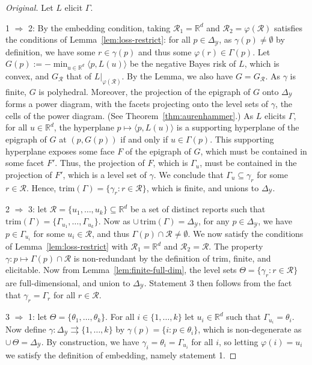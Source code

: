 \documentclass[12pt]{article}
\newcommand{\reals}{\mathbb{R}}
\newcommand{\simplex}{\Delta_\Y}
\newcommand{\R}{\mathcal{R}}
\newcommand{\Y}{\mathcal{Y}}
\newcommand{\inprod}[2]{\langle #1, #2 \rangle}%
\newcommand{\toto}{\rightrightarrows}
\newcommand{\trim}{\mathrm{trim}}
\begin{document}
\begin{proof}[Original]
	Let $L$ elicit $\Gamma$.
	
	1 $\Rightarrow$ 2:
	By the embedding condition, taking $\R_1 = \reals^d$ and $\R_2 = \varphi(\R)$ satisfies the conditions of Lemma~\ref{lem:loss-restrict}: for all $p\in\simplex$, as $\gamma(p) \neq \emptyset$ by definition, we have some $r\in\gamma(p)$ and thus some $\varphi(r) \in \Gamma(p)$.
	Let $G(p) := -\min_{u\in\reals^d} \inprod{p}{L(u)}$ be the negative Bayes risk of $L$, which is convex, and $G_{\R}$ that of $L|_{\varphi(\R)}$.
	By the Lemma, we also have $G = G_\R$.
	As $\gamma$ is finite, $G$ is polyhedral.
	Moreover, the projection of the epigraph of $G$ onto $\simplex$ forms a power diagram, with the facets projecting onto the level sets of $\gamma$, the cells of the power diagram.
	(See Theorem~\ref{thm:aurenhammer}.)
	As $L$ elicits $\Gamma$, for all $u\in\reals^d$, the hyperplane $p\mapsto \inprod{p}{L(u)}$ is a supporting hyperplane of the epigraph of $G$ at $(p,G(p))$ if and only if $u\in\Gamma(p)$.
	This supporting hyperplane exposes some face $F$ of the epigraph of $G$, which must be contained in some facet $F'$.
	Thus, the projection of $F$, which is $\Gamma_u$, must be contained in the projection of $F'$, which is a level set of $\gamma$.
	We conclude that $\Gamma_u \subseteq \gamma_r$ for some $r\in\R$.
	Hence, $\trim(\Gamma) = \{\gamma_r : r\in\R\}$, which is finite, and unions to $\simplex$.
	
	2 $\Rightarrow$ 3: let $\R = \{u_1,\ldots,u_k\} \subseteq\reals^d$ be a set of distinct reports such that $\trim(\Gamma) = \{\Gamma_{u_1},\ldots,\Gamma_{u_k}\}$.
	Now as $\cup\,\trim(\Gamma) = \simplex$, for any $p\in\simplex$, we have $p\in\Gamma_{u_i}$ for some $u_i\in\R$, and thus $\Gamma(p) \cap \R \neq \emptyset$.
	We now satisfy the conditions of Lemma~\ref{lem:loss-restrict} with $\R_1 = \reals^d$ and $\R_2 = \R$.
	The property $\gamma:p\mapsto\Gamma(p)\cap\R$ is non-redundant by the definition of $\trim$, finite, and elicitable.
	Now from Lemma~\ref{lem:finite-full-dim}, the level sets $\Theta = \{\gamma_r:r\in\R\}$ are full-dimensional, and union to $\simplex$.
	Statement 3 then follows from the fact that $\gamma_r = \Gamma_r$ for all $r\in\R$.
	
	3 $\Rightarrow$ 1: let $\Theta = \{\theta_1,\ldots,\theta_k\}$.
	For all $i\in\{1,\ldots,k\}$ let $u_i\in\reals^d$ such that $\Gamma_{u_i} = \theta_i$.
	Now define $\gamma:\simplex\toto\{1,\ldots,k\}$ by $\gamma(p) = \{i : p\in\theta_i\}$, which is non-degenerate as $\cup\,\Theta = \simplex$.
	By construction, we have $\gamma_i = \theta_i = \Gamma_{u_i}$ for all $i$, so letting $\varphi(i) = u_i$ we satisfy the definition of embedding, namely statement 1.
\end{proof}
\end{document}
